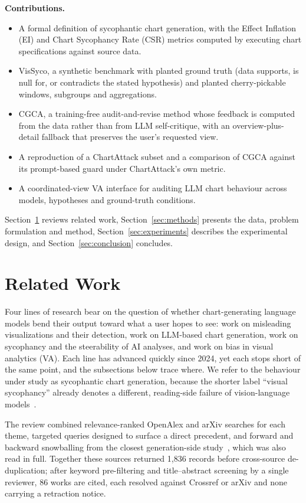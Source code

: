\documentclass[conference]{IEEEtran}
\begin{document}
\textbf{Contributions.}
\begin{itemize}
\item A formal definition of sycophantic chart generation, with the Effect Inflation (EI) and Chart Sycophancy Rate (CSR) metrics computed by executing chart specifications against source data.
\item VisSyco, a synthetic benchmark with planted ground truth (data supports, is null for, or contradicts the stated hypothesis) and planted cherry-pickable windows, subgroups and aggregations.
\item CGCA, a training-free audit-and-revise method whose feedback is computed from the data rather than from LLM self-critique, with an overview-plus-detail fallback that preserves the user's requested view.
\item A reproduction of a ChartAttack subset and a comparison of CGCA against its prompt-based guard under ChartAttack's own metric.
\item A coordinated-view VA interface for auditing LLM chart behaviour across models, hypotheses and ground-truth conditions.
\end{itemize}

Section~\ref{sec:related} reviews related work, Section~\ref{sec:methods} presents the data, problem formulation and method, Section~\ref{sec:experiments} describes the experimental design, and Section~\ref{sec:conclusion} concludes.

\section{Related Work}\label{sec:related}
Four lines of research bear on the question of whether chart-generating language models bend their output toward what a user hopes to see: work on misleading visualizations and their detection, work on LLM-based chart generation, work on sycophancy and the steerability of AI analyses, and work on bias in visual analytics (VA). Each line has advanced quickly since 2024, yet each stops short of the same point, and the subsections below trace where. We refer to the behaviour under study as sycophantic chart generation, because the shorter label ``visual sycophancy'' already denotes a different, reading-side failure of vision-language models~\cite{hong2026}.

The review combined relevance-ranked OpenAlex and arXiv searches for each theme, targeted queries designed to surface a direct precedent, and forward and backward snowballing from the closest generation-side study~\cite{ortizbarajas2026chartattack}, which was also read in full. Together these sources returned 1,836 records before cross-source de-duplication; after keyword pre-filtering and title--abstract screening by a single reviewer, 86 works are cited, each resolved against Crossref or arXiv and none carrying a retraction notice.
\end{document}
